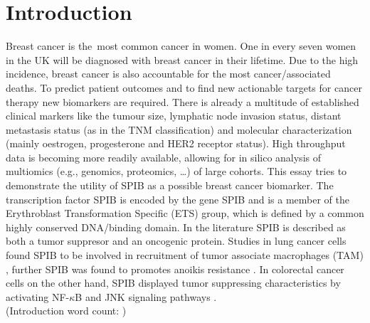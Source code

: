 \section{Introduction}
\countem

Breast cancer is the\ most common cancer in women.
One in every seven women in the UK will be diagnosed with breast cancer in their lifetime. 
Due to the high incidence, breast cancer is also accountable for the most cancer\-/associated deaths.
To predict patient outcomes and to find new actionable targets for cancer therapy new biomarkers are required.
There is already a multitude of established clinical markers like the tumour size, lymphatic node invasion status, distant metastasis status (as in the TNM classification) and molecular characterization (mainly oestrogen, progesterone and HER2 receptor status).
High throughput data is becoming more readily available, allowing for in silico analysis of multiomics (e.g., genomics, proteomics, \ldots) of large cohorts.
This essay tries to demonstrate the utility of SPIB as a possible breast cancer biomarker.
The transcription factor SPIB is encoded by the gene SPIB and is a member of the Erythroblast Transformation Specific (ETS) group, which is defined by a common highly conserved DNA\-/binding domain.
In the literature SPIB is described as both a tumor suppresor and an oncogenic protein.
Studies in lung cancer cells found SPIB to be involved in recruitment of tumor associate macrophages (TAM) \cite{Huang2021}, further SPIB was found to promotes anoikis resistance \cite{Zhang2020}.
In colorectal cancer cells on the other hand, SPIB displayed tumor suppressing characteristics by activating NF-$\kappa$B and JNK signaling pathways \cite{Zhao2021}.
\\
\endcountem 
(Introduction word count: \thewordcount{})